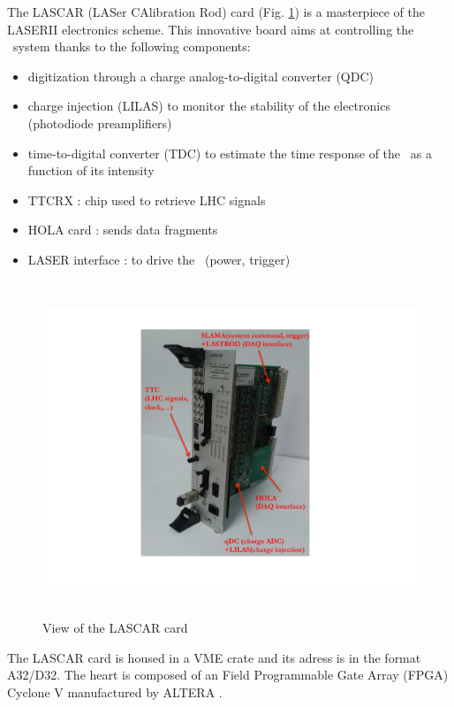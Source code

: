 The LASCAR (LASer CAlibration Rod) card (Fig. \ref{fig:laslascar}) is a masterpiece of the LASERII electronics scheme. This innovative board aims at controlling the \las~system thanks to the following components:
\begin{itemize}

\item digitization through a charge analog-to-digital converter (QDC)

\item charge injection (LILAS) to monitor the stability of the electronics (photodiode preamplifiers)

\item time-to-digital converter (TDC) to estimate the time response of the \las~as a function of its intensity

\item TTCRX : chip used to retrieve LHC signals

\item HOLA card : sends data fragments 

\item LASER interface : to drive the \las~(power, trigger)

\end{itemize}

\begin{figure}[htbp]

\centering
\includegraphics[height=10cm]{figures/Lascar_photo.pdf}
\caption{View of the LASCAR card}\label{fig:laslascar}
\end{figure}

The LASCAR card is housed in a VME crate and its adress is in the format A32/D32. The heart is composed of an Field Programmable Gate Array (FPGA) Cyclone V manufactured by ALTERA \cite{altera-cyclone}.

